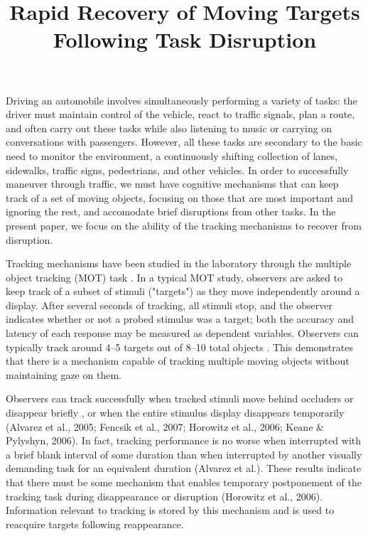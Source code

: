 \documentclass[man,nobf]{apa}
\title{Rapid Recovery of Moving Targets Following Task Disruption}
\begin{document}
\maketitle

Driving an automobile involves simultaneously performing a variety of
tasks: the driver must maintain control of the vehicle, react to traffic
signals, plan a route, and often carry out these tasks while also listening
to music or carrying on conversations with passengers.  However, all these
tasks are secondary to the basic need to monitor the environment, a
continuously shifting collection of lanes, sidewalks, traffic signs,
pedestrians, and other vehicles.  In order to successfully maneuver through
traffic, we must have cognitive mechanisms that can keep track of a set of
moving objects, focusing on those that are most important and ignoring the
rest, and accomodate brief disruptions from other tasks.  In the present
paper, we focus on the ability of the tracking mechanisms to recover from
disruption.

Tracking mechanisms have been studied in the laboratory through the
multiple object tracking (MOT) task \cite{PylyshynStorm1988}.  In a typical
MOT study, observers are asked to keep track of a subset of stimuli
("targets") as they move independently around a display.  After several
seconds of tracking, all stimuli stop, and the observer indicates whether
or not a probed stimulus was a target; both the accuracy and latency of
each response may be measured as dependent variables.  Observers can
typically track around 4--5 targets out of 8--10 total objects
\citeauthor{PylyshynStorm1988}.  This demonstrates that there is a
mechanism capable of tracking multiple moving objects without maintaining
gaze on them.

Observers can track successfully when tracked stimuli move behind occluders
or disappear briefly \cite{FlombaumScholl2008,SchollPylyshyn1999}, or when
the entire stimulus display disappears temporarily (Alvarez et al., 2005;
Fencsik et al., 2007; Horowitz et al., 2006; Keane \& Pylyshyn, 2006).  In
fact, tracking performance is no worse when interrupted with a brief blank
interval of some duration than when interrupted by another visually
demanding task for an equivalent duration (Alvarez et al.).  These results
indicate that there must be some mechanism that enables temporary
postponement of the tracking task during disappearance or disruption
(Horowitz et al., 2006).  Information relevant to tracking is stored by
this mechanism and is used to reacquire targets following reappearance.
\end{document}
